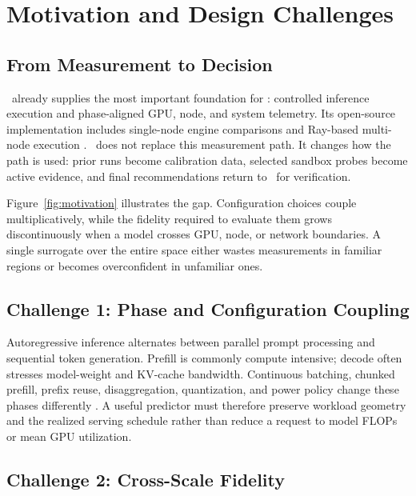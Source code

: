 \section{Motivation and Design Challenges}

\subsection{From Measurement to Decision}

\bench\ already supplies the most important foundation for \system: controlled
inference execution and phase-aligned GPU, node, and system telemetry.  Its
open-source implementation includes single-node engine comparisons and
Ray-based multi-node execution \cite{niu2026tokenpowerbench}.  \system\ does
not replace this measurement path.  It changes how the path is used: prior
runs become calibration data, selected sandbox probes become active evidence,
and final recommendations return to \bench\ for verification.

Figure~\ref{fig:motivation} illustrates the gap.  Configuration choices couple
multiplicatively, while the fidelity required to evaluate them grows
discontinuously when a model crosses GPU, node, or network boundaries.  A
single surrogate over the entire space either wastes measurements in familiar
regions or becomes overconfident in unfamiliar ones.



\subsection{Challenge 1: Phase and Configuration Coupling}

Autoregressive inference alternates between parallel prompt processing and
sequential token generation.  Prefill is commonly compute intensive; decode
often stresses model-weight and KV-cache bandwidth.  Continuous batching,
chunked prefill, prefix reuse, disaggregation, quantization, and power policy
change these phases differently \cite{kwon2023vllm,agrawal2024sarathi,
zhong2024distserve}.  A useful predictor must therefore preserve workload
geometry and the realized serving schedule rather than reduce a request to
model FLOPs or mean GPU utilization.

\subsection{Challenge 2: Cross-Scale Fidelity}

